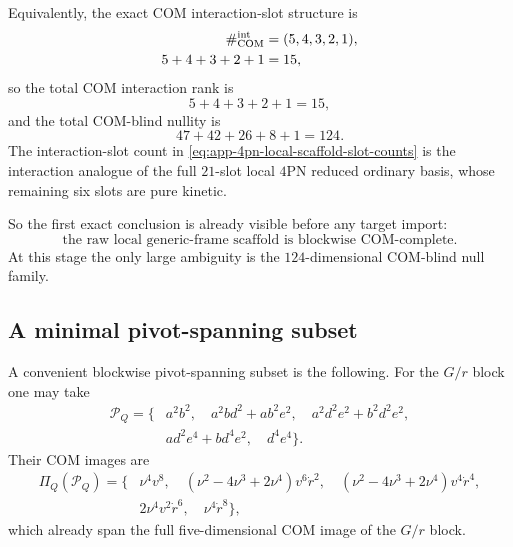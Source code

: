 \documentclass[11pt]{article}
\begin{document}
Equivalently, the exact COM interaction-slot structure is
\begin{equation}
\begin{aligned}
\#_{\rm COM}^{\rm int}&=(5,4,3,2,1),\\
5+4+3+2+1&=15,
\end{aligned}
\label{eq:app-4pn-local-scaffold-slot-counts}
\end{equation}
so the total COM interaction rank is
\begin{equation}
5+4+3+2+1=15,
\label{eq:app-4pn-local-scaffold-total-rank}
\end{equation}
and the total COM-blind nullity is
\begin{equation}
47+42+26+8+1=124.
\label{eq:app-4pn-local-scaffold-total-nullity}
\end{equation}
The interaction-slot count in
\eqref{eq:app-4pn-local-scaffold-slot-counts} is the interaction analogue of
the full $21$-slot local $4$PN reduced ordinary basis, whose remaining six
slots are pure kinetic.

So the first exact conclusion is already visible before any target import:
\begin{equation}
\boxed{
\text{the raw local generic-frame scaffold is blockwise COM-complete.}
}
\label{eq:app-4pn-local-scaffold-complete}
\end{equation}
At this stage the only large ambiguity is the $124$-dimensional COM-blind null
family.

\subsection{A minimal pivot-spanning subset}
\label{app:local-generic-frame-scaffold-pivots}

A convenient blockwise pivot-spanning subset is the following.  For the
\(G/r\) block one may take
\begin{equation}
\begin{aligned}
\mathcal P_Q=
\bigl\{
& a^2b^2,
\quad
a^2bd^2+ab^2e^2,
\quad
a^2d^2e^2+b^2d^2e^2,
\\[0.5ex]
& ad^2e^4+bd^4e^2,
\quad
d^4e^4
\bigr\}.
\end{aligned}
\label{eq:app-4pn-local-scaffold-pivots-Q}
\end{equation}
Their COM images are
\begin{equation}
\begin{aligned}
\Pi_Q(\mathcal P_Q)=
\bigl\{
& \nu^4 v^8,
\quad
(\nu^2-4\nu^3+2\nu^4) v^6\dot r^2,
\quad
(\nu^2-4\nu^3+2\nu^4) v^4\dot r^4,
\\[0.5ex]
& 2\nu^4 v^2\dot r^6,
\quad
\nu^4 \dot r^8
\bigr\},
\end{aligned}
\label{eq:app-4pn-local-scaffold-pivot-images-Q}
\end{equation}
which already span the full five-dimensional COM image of the \(G/r\) block.
\end{document}
